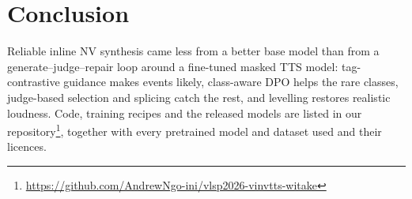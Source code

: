 \documentclass[11pt]{article}
\begin{document}
\section{Conclusion}
Reliable inline NV synthesis came less from a better base model than from a generate--judge--repair loop around a
fine-tuned masked TTS model: tag-contrastive guidance makes events likely, class-aware DPO helps the rare classes,
judge-based selection and splicing catch the rest, and levelling restores realistic loudness. Code, training recipes and
the released models are listed in our repository\footnote{\url{https://github.com/AndrewNgo-ini/vlsp2026-vinvtts-witake}},
together with every pretrained model and dataset used and their licences.


\end{document}
